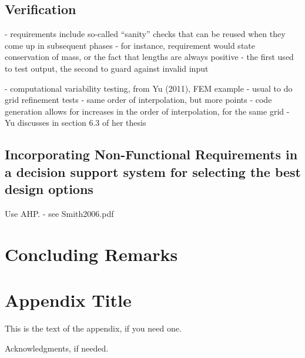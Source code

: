 \documentclass[10pt, preprint]{sigplanconf}
\begin{document}
\subsection{Verification}
\label{subsec:verification}

- requirements include so-called “sanity” checks that can be reused when they come up in subsequent phases
- for instance, requirement would state conservation of mass, or the fact that lengths are always positive - the first used to test output, the second to guard against invalid input

- computational variability testing, from Yu (2011), FEM example
- usual to do grid refinement tests - same order of interpolation, but more points
- code generation allows for increases in the order of interpolation, for the same grid
- Yu discusses in section 6.3 of her thesis

\subsection{Incorporating Non-Functional Requirements in a decision support system for selecting the best design options}
\label{subsec:incorporating}

Use AHP. - see Smith2006.pdf

\section{Concluding Remarks}
\label{sec:concluding}

\appendix
\section{Appendix Title}

This is the text of the appendix, if you need one.

\acks

Acknowledgments, if needed.





\begin{thebibliography}{}
\softraggedright


\end{thebibliography}
\end{document}
